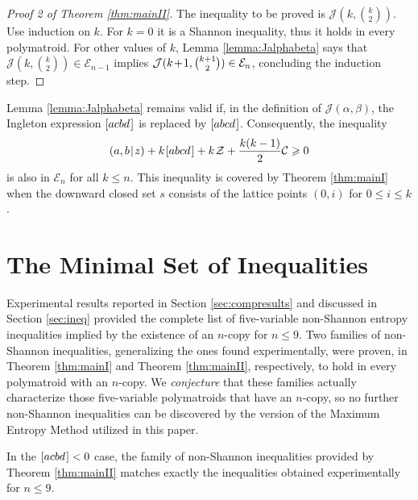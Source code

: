 \documentclass[reqno]{amsart}
\theoremstyle{definition}
\newcommand\tsp{\mkern 1.5mu}
\def\|{\mkern1.5mu{|}\mkern1.5mu}
\renewcommand\ge{\geqslant}\renewcommand\le{\leqslant}
\newcommand\C{\mathcal C}
\newcommand\J{\mathcal J} %
\newcommand\Z{\mathcal Z} %
\def\m#1{\tsp{#1}\tsp}
\def\abcd{[abcd\tsp]}
\def\acbd{[acbd\tsp]}
\begin{document}
\begin{proof}[Proof 2 of Theorem \ref{thm:mainII}]
The inequality to be proved is $\J(k,{k\choose 2})$. Use induction on $k$.
For $k=0$ it is a Shannon inequality, thus it holds in every polymatroid.
For other values of $k$, Lemma \ref{lemma:Jalphabeta} says that
$\J(k,{k\choose 2})\in\mathcal E_{n-1}$ implies $\J(k\m+1,{k+1\choose
2})\in\mathcal E_n$, concluding the induction step.
\end{proof}

Lemma \ref{lemma:Jalphabeta} remains valid if, in the definition of
$\J(\alpha,\beta)$, the Ingleton expression $\acbd$ is replaced by $\abcd$.
Consequently, the inequality
$$
   (a,b\|z)+k\tsp\abcd+k\tsp\Z+\frac{k(k-1)}2\C \ge 0
$$
is also in $\mathcal E_n$ for all $k\le n$. This inequality is covered by
Theorem \ref{thm:mainI} when the downward closed set $s$ consists of the
lattice points $(0,i)$ for $0\le i\le k$.


\section{The Minimal Set of Inequalities}\label{sec:reducedset}

Experimental results reported in Section \ref{sec:compresults} and discussed
in Section \ref{sec:ineq} provided the complete list of five-variable
non-Shannon entropy inequalities implied by the existence of an $n$-copy for
$n\le 9$. Two families of non-Shannon inequalities, generalizing the ones
found experimentally, were proven, in Theorem \ref{thm:mainI} and Theorem
\ref{thm:mainII}, respectively, to hold in every polymatroid with an
$n$-copy. We \emph{conjecture} that these families actually characterize
those five-variable polymatroids that have an $n$-copy, so no further
non-Shannon inequalities can be discovered by the version of the Maximum
Entropy Method utilized in this paper.

In the $\acbd<0$ case, the family of non-Shannon inequalities provided by
Theorem \ref{thm:mainII} matches exactly the inequalities obtained
experimentally for $n\le 9$.
\end{document}
